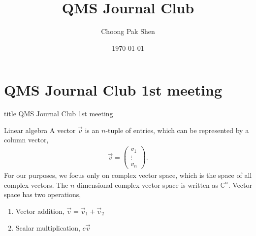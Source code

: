 \documentclass{beamer}
\begin{document}
\title{QMS Journal Club}
\author{Choong Pak Shen}
\date{\today}

\begin{frame}
\titlepage
\end{frame}

\section{QMS Journal Club 1st meeting}
\begin{frame}
\vfill
\centering
\begin{beamercolorbox}[sep=8pt,center,shadow=true,rounded=true]{title}
\Large QMS Journal Club 1st meeting
\end{beamercolorbox}
\vfill
\end{frame}

\begin{frame}{Linear algebra}
\justify
A vector $\vec{v}$ is an $n$-tuple of entries, which can be represented by a column vector,
\begin{align}
\vec{v} = \begin{pmatrix} v_1 \\ \vdots \\ v_n \end{pmatrix}.
\end{align}
\vfill
For our purposes, we focus only on complex vector space, which is the space of all complex vectors. The $n$-dimensional complex vector space is written as $\mathbb{C}^n$.
\vfill
Vector space has two operations,
\begin{enumerate}
\item Vector addition, $\vec{v} = \vec{v}_1 + \vec{v}_2$
\item Scalar multiplication, $c \vec{v}$
\end{enumerate}
\end{frame}
\end{document}
